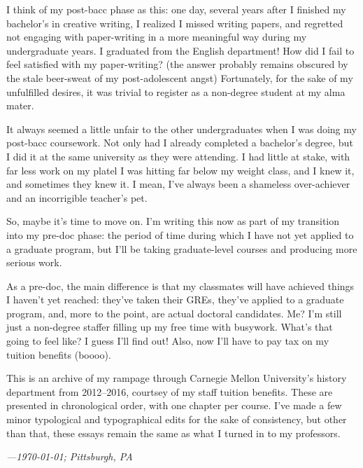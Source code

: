 I think of my post-bacc phase as this: one day, several years after I finished
my bachelor's in creative writing, I realized I missed writing papers, and
regretted not engaging with paper-writing in a more meaningful way during my
undergraduate years. I graduated from the English department! How did I fail to
feel satisfied with my paper-writing? (the answer probably remains obscured by
the stale beer-sweat of my post-adolescent angst) Fortunately, for the sake of
my unfulfilled desires, it was trivial to register as a non-degree student at my
alma mater.

It always seemed a little unfair to the other undergraduates when I was doing my
post-bacc coursework. Not only had I already completed a bachelor's degree, but
I did it at the same university as they were attending. I had little at stake,
with far less work on my platel I was hitting far below my weight class, and I
knew it, and sometimes they knew it. I mean, I've always been a shameless
over-achiever and an incorrigible teacher's pet.

So, maybe it's time to move on. I'm writing this now as part of my transition
into my pre-doc phase: the period of time during which I have not yet applied to
a graduate program, but I'll be taking graduate-level courses and producing more
serious work.

As a pre-doc, the main difference is that my classmates will have achieved
things I haven't yet reached: they've taken their GREs, they've applied to a
graduate program, and, more to the point, are actual doctoral candidates. Me?
I'm still just a non-degree staffer filling up my free time with busywork.
What's that going to feel like? I guess I'll find out! Also, now I'll have to
pay tax on my tuition benefits (boooo).

This is an archive of my rampage through Carnegie Mellon University's history
department from 2012--2016, courtsey of my staff tuition benefits. These are
presented in chronological order, with one chapter per course. I've made a few
minor typological and typographical edits for the sake of consistency, but other
than that, these essays remain the same as what I turned in to my professors.

%

\textit{---\today; Pittsburgh, PA}
